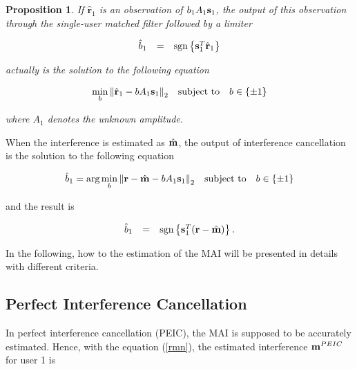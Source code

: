 \documentclass[a4paper,12pt,fleqn]{article}
\newtheorem{Prop}{Proposition}
\newcommand{\br}{{\mathbf r}}
\newcommand{\bs}{{\bf s}}
\newcommand{\bm}{{\bf m}}
\begin{document}
\begin{Prop}

If $\hat\br_1$ is an observation of $b_1A_1\bs_1$, the output of
this observation through the single-user matched filter followed
by a limiter

\begin{equation}
\begin{array}{rcl}
\hat{b}_1&=&\mbox{sgn}\left\{\bs_1^T\hat\br_1\right\}
\end{array}
\end{equation}

\noindent actually is the solution to the following equation

\begin{equation}
\begin{array}{rcl}
\min\limits_{b}\left\|\hat\br_1-bA_1\bs_1\right\|_2&\mbox{subject
to}&b\in\{\pm1\}
\end{array}
\end{equation}

\noindent where $A_1$ denotes the unknown amplitude.

\end{Prop}

When the interference is estimated as $\hat{\bm}$, the output of
interference cancellation is the solution to the following
equation

\begin{equation}
\begin{array}{rcl}
\hat{b}_1=\mbox{arg}\min\limits_{b}\left\|\br-\hat{\bm}-bA_1\bs_1\right\|_2&\mbox{subject
to}&b\in\{\pm1\}
\end{array}\label{b-IC}
\end{equation}

\noindent and the result is

\begin{equation}
\begin{array}{rcl}
\hat{b}_1&=&\mbox{sgn}\left\{\bs_1^T(\br-\hat\bm)\right\}.
\end{array}
\end{equation}


In the following, how to the estimation of the MAI will be
presented in details with different criteria.

\subsection{Perfect Interference Cancellation}

In perfect interference cancellation (PEIC), the MAI is supposed
to be accurately estimated. Hence, with the equation (\ref{rmn}),
the estimated interference $\bm^{PEIC}$ for user 1 is
\end{document}
